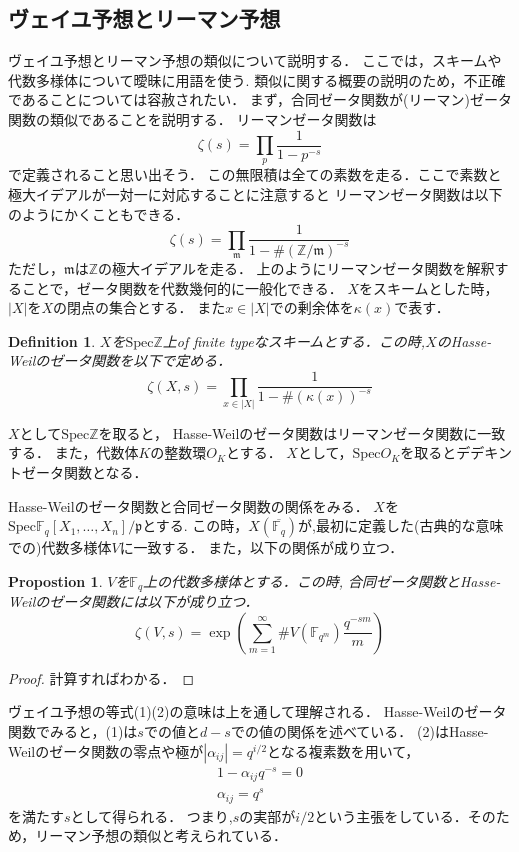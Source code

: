 \documentclass{ujarticle}
\newtheorem{dfn}[thm]{Definition}
\newtheorem{prop}[thm]{Propostion}
\begin{document}
\subsection{ヴェイユ予想とリーマン予想}
\label{sub:ヴェイユ予想とリーマン予想}

ヴェイユ予想とリーマン予想の類似について説明する．
ここでは，スキームや代数多様体について曖昧に用語を使う.
類似に関する概要の説明のため，不正確であることについては容赦されたい．
まず，合同ゼータ関数が(リーマン)ゼータ関数の類似であることを説明する．
リーマンゼータ関数は
\begin{equation*}
 \zeta(s)= \prod_{p}\frac{1}{1-p^{-s}}
\end{equation*}
で定義されること思い出そう．
この無限積は全ての素数を走る．ここで素数と極大イデアルが一対一に対応することに注意すると
リーマンゼータ関数は以下のようにかくこともできる．
\begin{equation*}
 \zeta(s) = \prod_{\mathfrak{m}}
 \frac{1}{1-{\#(\mathbb{Z}/\mathfrak{m})}^{-s}}
\end{equation*}
ただし，$\mathfrak{m}$は$\mathbb{Z}$の極大イデアルを走る．
上のようにリーマンゼータ関数を解釈することで，ゼータ関数を代数幾何的に一般化できる．
$X$をスキームとした時，$|X|$を$X$の閉点の集合とする．
また$x \in |X|$での剰余体を$\kappa(x)$で表す．
\begin{dfn}
  $X$を$\mathrm{Spec}\mathbb{Z}$上of finite typeなスキームとする．この時,$X$のHasse-Weilのゼータ関数を以下で定める．
  \begin{equation*}
   \zeta(X,s)=\prod_{x \in |X|} \frac{1}{1-\#(\kappa(x))^{-s}}
  \end{equation*}
\end{dfn}
$X$として$\mathrm{Spec}\mathbb{Z}$を取ると，
Hasse-Weilのゼータ関数はリーマンゼータ関数に一致する．
また，代数体$K$の整数環$O_K$とする．
$X$として，$\mathrm{Spec}O_K$を取るとデデキントゼータ関数となる．

Hasse-Weilのゼータ関数と合同ゼータ関数の関係をみる．
$X$を$\mathrm{Spec}\mathbb{F}_q[X_1,\dots,X_n]/\mathfrak{p}$とする.
この時，$X(\overline{\mathbb{F}_q})$が,最初に定義した(古典的な意味での)代数多様体$V$に一致する．
また，以下の関係が成り立つ．
\begin{prop}
  $V$を$\mathbb{F}_q$上の代数多様体とする．この時,
  合同ゼータ関数とHasse-Weilのゼータ関数には以下が成り立つ．
  \begin{equation*}
   \zeta(V,s)=\exp(\sum_{m=1}^{\infty}\#V(\mathbb{F}_{q^m}) \frac{q^{-sm}}{m})
  \end{equation*}
\end{prop}
\begin{proof}
 計算すればわかる．
\end{proof}
ヴェイユ予想の等式(1)(2)の意味は上を通して理解される．
Hasse-Weilのゼータ関数でみると，(1)は$s$での値と$d-s$での値の関係を述べている．
(2)はHasse-Weilのゼータ関数の零点や極が$|\alpha_{ij}|=q^{i/2}$となる複素数を用いて，
\begin{eqnarray*}
   1- \alpha_{ij} q^{-s}=0  \\
   \alpha_{ij} =q^{s}
\end{eqnarray*}
を満たす$s$として得られる．
つまり,$s$の実部が$i/2$という主張をしている．そのため，リーマン予想の類似と考えられている．
\end{document}
